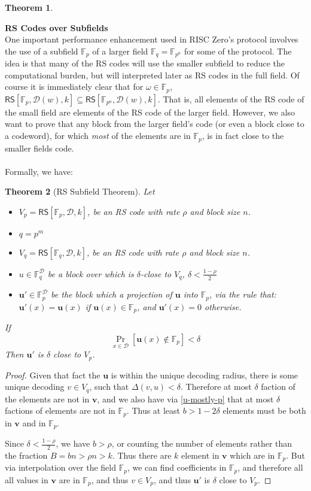\documentclass[10pt,letterpaper,titlepage]{article}
\newcommand{\GF}[1]{\mathbb{F}_{#1}}
\newcommand{\w}[0]{\omega}
\newcommand{\p}[0]{\rho}
\newcommand{\dd}[0]{\delta}
\newcommand{\D}[0]{\mathcal{D}}
\newtheorem{theorem}{Theorem}
\theoremstyle{definition}
\begin{document}
\begin{appendices}
\begin{theorem}
\end{theorem}
\noindent
\textbf{RS Codes over Subfields}\\
One important performance enhancement used in RISC Zero's protocol involves the use of a subfield $\GF{p}$ of a larger field $\GF{q}=\GF{p^n}$ for some of the protocol.
The idea is that many of the RS codes will use the smaller subfield to reduce the computational burden, but will interpreted later as RS codes in the full field.
Of course it is immediately clear that for $\w \in \GF{p}$, $\mathsf{RS}[\GF{p}, \D(w), k] \subseteq \mathsf{RS}[\GF{p^n}, \D(w), k]$.
That is, all elements of the RS code of the small field are elements of the RS code of the larger field.
However, we also want to prove that any block from the larger field's code (or even a block close to a codeword), for which \emph{most} of the elements are in $\GF{p}$, is in fact close to the smaller fields code.\\
\\
Formally, we have:
\begin{theorem}[RS Subfield Theorem]
  Let
  \begin{itemize}
    \item $V_p = \mathsf{RS}[\GF{p}, \D, k]$, be an RS code with rate $\p$ and block size $n$.
    \item $q = p^m$
    \item $V_q = \mathsf{RS}[\GF{q}, \D, k]$, be an RS code with rate $\p$ and block size $n$.
    \item $u \in \GF{q}^\D$ be a block over which is $\dd$-close to $V_q$, $\dd < \frac{1 - \p}{2}$
    \item $\mathbf{u'} \in \GF{p}^\D$ be the block which a projection of $\mathbf{u}$ into $\GF{p}$, via the rule that:
          $\mathbf{u'}(x) = \mathbf{u}(x)$ if $\mathbf{u}(x) \in \GF{p}$, and $\mathbf{u'}(x) = 0$ otherwise.
  \end{itemize}
  If \begin{equation}
    \label{u-mostly-p}
    \Pr_{x \in \D}[\mathbf{u}(x) \notin \GF{p}] < \dd
  \end{equation}
  Then $\mathbf{u'}$ is $\dd$ close to $V_p$.
\end{theorem}
\begin{proof}
  Given that fact the $\mathbf{u}$ is within the unique decoding radius, there is some unique decoding $v \in V_q$, such that $\Delta(v, u) < \dd$.
  Therefore at most $\dd$ faction of the elements are not in $\mathbf{v}$, and we also have via \ref{u-mostly-p} that at most $\dd$ factions of elements are not in $\GF{p}$.
  Thus at least $b > 1 - 2 \dd$ elements must be both in $\mathbf{v}$ and in $\GF{p}$.

  Since $\dd < \frac{1 - \p}{2}$, we have $b > \p$, or counting the number of elements rather than the fraction $B = b n > \p n > k$.  
  Thus there are $k$ element in $\mathbf{v}$ which are in $\GF{p}$.  
  But via interpolation over the field $\GF{p}$, we can find coefficients in $\GF{p}$, and therefore all all values in $\mathbf{v}$ are in $\GF{p}$, and thus $v \in V_p$, and thus $\mathbf{u'}$ is $\dd$ close to $V_p$.
\end{proof}
\end{appendices}
\end{document}

